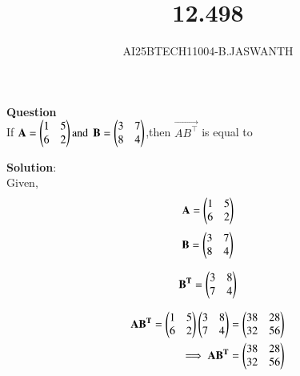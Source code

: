 \documentclass[journal]{IEEEtran}
\begin{document}

\vspace{3cm}


\renewcommand{\thetable}{\theenumi}




\vspace{3cm}


\title{12.498}
\author{AI25BTECH11004-B.JASWANTH}
{\let\newpage\relax\maketitle}


\renewcommand{\thefigure}{\theenumi}
\renewcommand{\thetable}{\theenumi}
\setlength{\intextsep}{10pt} %

\textbf{Question}\\
If $\Vec{A}=\myvec{1 & 5 \\
        6 & 2} \text{and}$  $\Vec{B}=\myvec{3 & 7 \\
            8 & 4}$,then $\vec{AB^\top}$ is equal to
\begin{enumerate}[label=(\alph*)]
\begin{multicols}{4}
\item  {}
\item  {}
\item  {}
\item  {}
 \end{multicols}
\end{enumerate}            

\textbf{Solution}:\\
Given,
\begin{align}
\mathbf{A} = \begin{pmatrix}1 & 5 \\ 6 & 2\end{pmatrix}
\end{align}
\begin{align}
\mathbf{B} = \begin{pmatrix}3 & 7 \\ 8 & 4\end{pmatrix}
\end{align}

\begin{align}
\mathbf{B^T} = \begin{pmatrix}3 & 8 \\ 7 & 4\end{pmatrix}
\end{align}

\begin{align}
\mathbf{AB^T} = \begin{pmatrix}1 & 5 \\ 6 & 2\end{pmatrix}\begin{pmatrix}3 & 8 \\ 7 & 4\end{pmatrix}
= \begin{pmatrix}38 & 28 \\ 32 & 56\end{pmatrix}\\
\implies \mathbf{AB^T}=\begin{pmatrix}
    38 & 28\\
    32 & 56
\end{pmatrix} 
\end{align}
\end{document}
